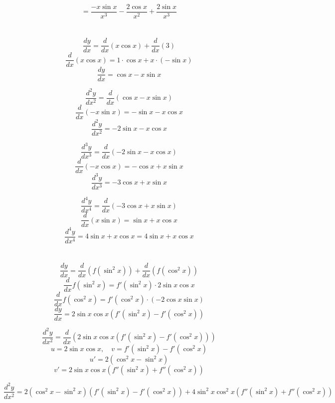 \documentclass{article}
\begin{document}
\[
= \boxed{\frac{-x \sin{x}}{x^3} - \frac{2 \cos{x}}{x^2} + \frac{2 \sin{x}}{x^3}}
\]

\section{}

\subsection{}
	
\[
\frac{dy}{dx} = \frac{d}{dx} \left( x \cos{x} \right) + \frac{d}{dx}(3)
\]
\[
\frac{d}{dx}(x \cos{x}) = 1 \cdot \cos{x} + x \cdot (-\sin{x})
\]
\[
\frac{dy}{dx} = \cos{x} - x \sin{x}
\]

\[
\frac{d^2y}{dx^2} = \frac{d}{dx} \left( \cos{x} - x \sin{x} \right)
\]
\[
\frac{d}{dx}(-x \sin{x}) = -\sin{x} - x \cos{x}
\]
\[
\frac{d^2y}{dx^2} = -2 \sin{x} - x \cos{x}
\]

\[
\frac{d^3y}{dx^3} = \frac{d}{dx} \left( -2 \sin{x} - x \cos{x} \right)
\]
\[
\frac{d}{dx}(-x \cos{x}) = -\cos{x} + x \sin{x}
\]
\[
\frac{d^3y}{dx^3} = -3 \cos{x} + x \sin{x}
\]

\[
\frac{d^4y}{dx^4} = \frac{d}{dx} \left( -3 \cos{x} + x \sin{x} \right)
\]
\[
\frac{d}{dx}(x \sin{x}) = \sin{x} + x \cos{x}
\]
\[
\frac{d^4y}{dx^4} = 4 \sin{x} + x \cos{x} =\boxed{ 4 \sin{x} + x \cos{x}}
\]
\section{}
\subsection{}
\[
\frac{dy}{dx} = \frac{d}{dx} \left( f(\sin^2{x}) \right) + \frac{d}{dx} \left( f(\cos^2{x}) \right)
\]
\[
\frac{d}{dx} f(\sin^2{x}) = f'(\sin^2{x}) \cdot 2 \sin{x} \cos{x}
\]
\[
\frac{d}{dx} f(\cos^2{x}) = f'(\cos^2{x}) \cdot (-2 \cos{x} \sin{x})
\]
\[
\frac{dy}{dx} = 2 \sin{x} \cos{x} \left( f'(\sin^2{x}) - f'(\cos^2{x}) \right)
\]

\[
\frac{d^2y}{dx^2} = \frac{d}{dx} \left( 2 \sin{x} \cos{x} \left( f'(\sin^2{x}) - f'(\cos^2{x}) \right) \right)
\]
\[
u = 2 \sin{x} \cos{x}, \quad v = f'(\sin^2{x}) - f'(\cos^2{x})
\]
\[
u' = 2 \left( \cos^2{x} - \sin^2{x} \right)
\]
\[
v' = 2 \sin{x} \cos{x} \left( f''(\sin^2{x}) + f''(\cos^2{x}) \right)
\]

\[
\frac{d^2y}{dx^2} = \boxed{2 \left( \cos^2{x} - \sin^2{x} \right) \left( f'(\sin^2{x}) - f'(\cos^2{x}) \right) + 4 \sin^2{x} \cos^2{x} \left( f''(\sin^2{x}) + f''(\cos^2{x}) \right)}
\]
\end{document}
